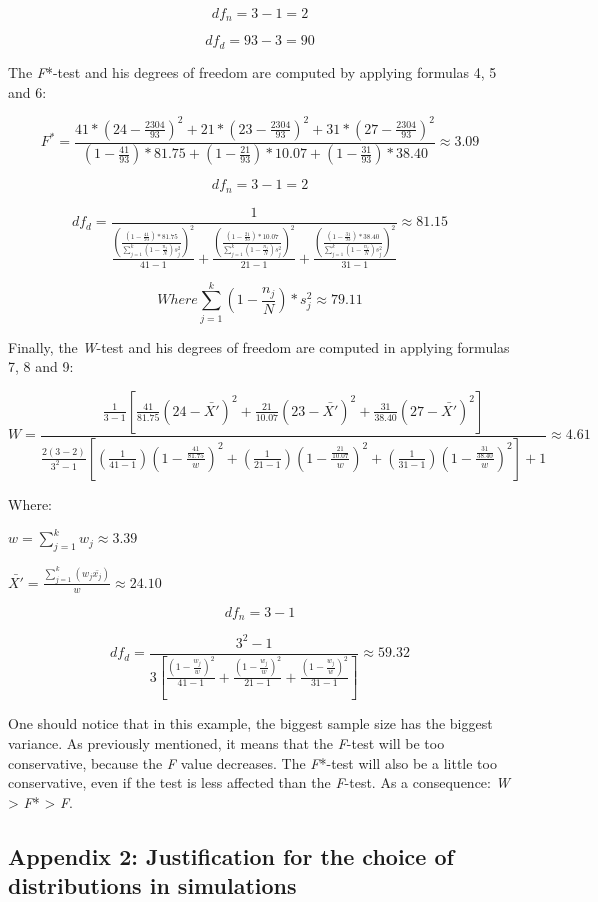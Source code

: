 \begin{appendix}
\[
df_n=3-1=2
\]

\[
df_d=93-3=90
\]

The \emph{F}*-test and his degrees of freedom are computed by applying
formulas 4, 5 and 6:

\[
F^*=\frac{41*(24-\frac{2304}{93})^2+21*(23-\frac{2304}{93})^2+31*(27-\frac{2304}{93})^2}{(1-\frac{41}{93})*81.75+(1-\frac{21}{93})*10.07+(1-\frac{31}{93})*38.40} \approx 3.09
\]

\[
df_n=3-1=2
\]

\[
df_d=\frac{1}{\frac{(\frac{(1-\frac{41}{93})*81.75}{\sum_{j=1}^k(1-\frac{n_j}{N})s_j^2})^2}{41-1}+\frac{(\frac{(1-\frac{21}{93})*10.07}{\sum_{j=1}^k(1-\frac{n_j}{N})s_j^2})^2}{21-1}+\frac{(\frac{(1-\frac{31}{93})*38.40}{\sum_{j=1}^k(1-\frac{n_j}{N})s_j^2})^2}{31-1}} \approx 81.15
\]

\[ Where \sum_{j=1}^k(1-\frac{n_j}{N})*s_j^2 \approx 79.11\]

Finally, the \emph{W}-test and his degrees of freedom are computed in
applying formulas 7, 8 and 9:

\[
W=\frac{\frac{1}{3-1}[\frac{41}{81.75}(24-\bar{X'})^2+\frac{21}{10.07}(23-\bar{X'})^2+\frac{31}{38.40}(27-\bar{X'})^2]}
{\frac{2(3-2)}{3^2-1}[(\frac{1}{41-1})(1-\frac{\frac{41}{81.75}}{w})^2+(\frac{1}{21-1})(1-\frac{\frac{21}{10.07}}{w})^2+(\frac{1}{31-1})(1-\frac{\frac{31}{38.40}}{w})^2]+1} \approx 4.61
\]

Where:

\(w=\sum_{j=1}^k w_j \approx 3.39\)

\(\bar{X'}=\frac{\sum_{j=1}^k (w_j\bar{x_j})}{w} \approx 24.10\)

\[
df_n=3-1
\]

\[
df_d=\frac{3^2-1}{3[\frac{(1-\frac{w_j}{w})^2}{41-1}+\frac{(1-\frac{w_j}{w})^2}{21-1}+\frac{(1-\frac{w_j}{w})^2}{31-1}]} \approx 59.32
\]

One should notice that in this example, the biggest sample size has the
biggest variance. As previously mentioned, it means that the
\emph{F}-test will be too conservative, because the \emph{F} value
decreases. The \emph{F}*-test will also be a little too conservative,
even if the test is less affected than the \emph{F}-test. As a
consequence: \emph{W} \textgreater{} \emph{F}* \textgreater{} \emph{F}.

\hypertarget{appendix-2-justification-for-the-choice-of-distributions-in-simulations}{%
\subsection{Appendix 2: Justification for the choice of distributions in
simulations}\label{appendix-2-justification-for-the-choice-of-distributions-in-simulations}}


\end{appendix}

